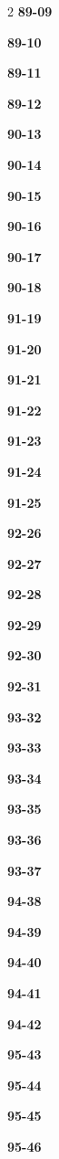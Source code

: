 \documentclass[10pt,a4paper]{article}
\begin{document}
\begin{multicols}{2}
\noindent\textbf{89-09}\ \par
\noindent\textbf{89-10}\ \par
\noindent\textbf{89-11}\ \par
\noindent\textbf{89-12}\ \par
\noindent\textbf{90-13}\ \par
\noindent\textbf{90-14}\ \par
\noindent\textbf{90-15}\ \par
\noindent\textbf{90-16}\ \par
\noindent\textbf{90-17}\ \par
\noindent\textbf{90-18}\ \par
\noindent\textbf{91-19}\ \par
\noindent\textbf{91-20}\ \par
\noindent\textbf{91-21}\ \par
\noindent\textbf{91-22}\ \par
\noindent\textbf{91-23}\ \par
\noindent\textbf{91-24}\ \par
\noindent\textbf{91-25}\ \par
\noindent\textbf{92-26}\ \par
\noindent\textbf{92-27}\ \par
\noindent\textbf{92-28}\ \par
\noindent\textbf{92-29}\ \par
\noindent\textbf{92-30}\ \par
\noindent\textbf{92-31}\ \par
\noindent\textbf{93-32}\ \par
\noindent\textbf{93-33}\ \par
\noindent\textbf{93-34}\ \par
\noindent\textbf{93-35}\ \par
\noindent\textbf{93-36}\ \par
\noindent\textbf{93-37}\ \par
\noindent\textbf{94-38}\ \par
\noindent\textbf{94-39}\ \par
\noindent\textbf{94-40}\ \par
\noindent\textbf{94-41}\ \par
\noindent\textbf{94-42}\ \par
\noindent\textbf{95-43}\ \par
\noindent\textbf{95-44}\ \par
\noindent\textbf{95-45}\ \par
\noindent\textbf{95-46}\ \par

\end{multicols}
\end{document}
